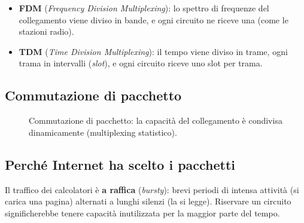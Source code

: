 \begin{itemize}
    \item \textbf{FDM} (\emph{Frequency Division Multiplexing}): lo spettro di frequenze del collegamento
          viene diviso in bande, e ogni circuito ne riceve una (come le stazioni radio).
    \item \textbf{TDM} (\emph{Time Division Multiplexing}): il tempo viene diviso in trame, ogni trama in
          intervalli (\emph{slot}), e ogni circuito riceve uno slot per trama.
\end{itemize}

\subsection{Commutazione di pacchetto}


\begin{figure}[H]
\centering
{}
\caption{Commutazione di pacchetto: la capacità del collegamento è condivisa dinamicamente (multiplexing statistico).}
\end{figure}

\subsection{Perché Internet ha scelto i pacchetti}

Il traffico dei calcolatori è \textbf{a raffica} (\emph{bursty}): brevi periodi di intensa attività
(si carica una pagina) alternati a lunghi silenzi (la si legge). Riservare un circuito
significherebbe tenere capacità inutilizzata per la maggior parte del tempo.

